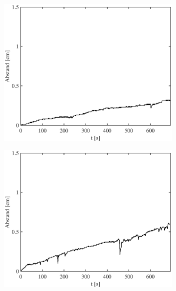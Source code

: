 \documentclass[doc,a4paper,12pt]{apa6}
\begin{document}
\begin{figure}
\begin{subfigure}[c]{0.23\textwidth}
    \label{img:bewegung:pa07:6}
  \end{subfigure}\vspace*{0.04\textwidth}
  \begin{subfigure}[c]{0.23\textwidth}
    \includegraphics[width=\textwidth]{ergebnisse/pa10/pa10a1_mc_dist_movement.eps}
    \label{img:bewegung:pa10:1}
  \end{subfigure}\hspace*{0.02\textwidth}
  \begin{subfigure}[c]{0.23\textwidth}
    \includegraphics[width=\textwidth]{ergebnisse/pa10/pa10a3_mc_dist_movement.eps}

\end{subfigure}
\end{figure}
\end{document}
